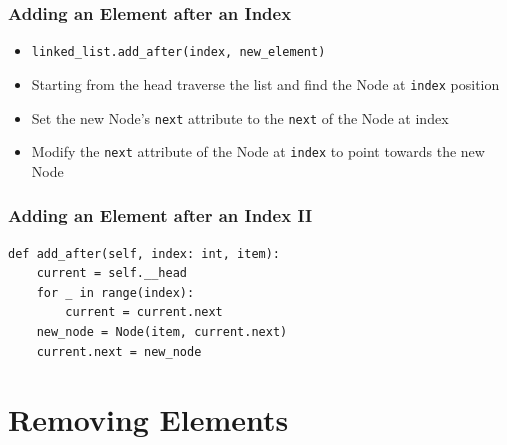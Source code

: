 \documentclass[11pt]{beamer}
\begin{document}
	\begin{frame}
		\frametitle{Adding an Element after an Index}
		\begin{itemize}
			\item \lstinline|linked_list.add_after(index, new_element)|
			\item Starting from the head traverse the list and find the Node at \texttt{index} position
			\item Set the new Node's \texttt{next} attribute to the \texttt{next} of the Node at index
			\item Modify the \texttt{next} attribute of the Node at \texttt{index} to point towards the new Node
		\end{itemize}
		\vspace{0.7cm}
		\begin{center}
		\end{center}
	\end{frame}

	\begin{frame}[fragile]
		\frametitle{Adding an Element after an Index II}
\begin{lstlisting}
def add_after(self, index: int, item):
	current = self.__head
	for _ in range(index):
		current = current.next
	new_node = Node(item, current.next)
	current.next = new_node
\end{lstlisting}
	\end{frame}

\section{Removing Elements}
\end{document}
